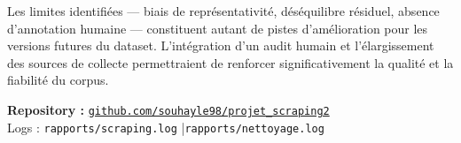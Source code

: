 \documentclass[12pt,a4paper]{article}
\begin{document}
Les limites identifiées — biais de représentativité, déséquilibre résiduel,
absence d'annotation humaine — constituent autant de pistes d'amélioration pour
les versions futures du dataset. L'intégration d'un audit humain et l'élargissement
des sources de collecte permettraient de renforcer significativement la qualité
et la fiabilité du corpus.

\vspace{1em}
\begin{center}
\begin{tcolorbox}[colback=lightblue, colframe=primary, arc=6pt,
                  boxrule=1pt, width=0.75\linewidth]
  \centering
  \textbf{Repository :}
  \href{https://github.com/souhayle98/projet_scraping2}
       {\color{secondary}\texttt{github.com/souhayle98/projet\_scraping2}}\\[0.3em]
  \small Logs : \texttt{rapports/scraping.log} \quad|\quad \texttt{rapports/nettoyage.log}
\end{tcolorbox}
\end{center}
\end{document}
